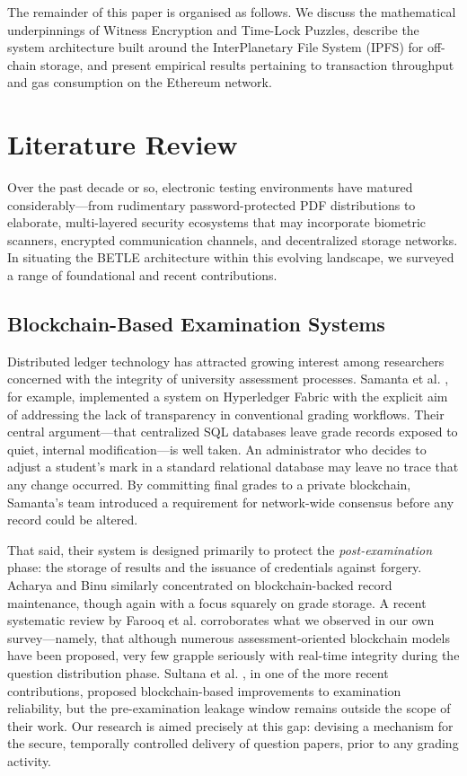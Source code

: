 \documentclass[final,5p,times]{elsarticle}
\begin{document}
The remainder of this paper is organised as follows. We discuss the mathematical underpinnings of Witness Encryption and Time-Lock Puzzles, describe the system architecture built around the InterPlanetary File System (IPFS) for off-chain storage, and present empirical results pertaining to transaction throughput and gas consumption on the Ethereum network.

\section{Literature Review}

Over the past decade or so, electronic testing environments have matured considerably—from rudimentary password-protected PDF distributions to elaborate, multi-layered security ecosystems that may incorporate biometric scanners, encrypted communication channels, and decentralized storage networks. In situating the BETLE architecture within this evolving landscape, we surveyed a range of foundational and recent contributions.

\subsection{Blockchain-Based Examination Systems}
Distributed ledger technology has attracted growing interest among researchers concerned with the integrity of university assessment processes. Samanta et al. \cite{samanta2021blockchain}, for example, implemented a system on Hyperledger Fabric with the explicit aim of addressing the lack of transparency in conventional grading workflows. Their central argument—that centralized SQL databases leave grade records exposed to quiet, internal modification—is well taken. An administrator who decides to adjust a student's mark in a standard relational database may leave no trace that any change occurred. By committing final grades to a private blockchain, Samanta's team introduced a requirement for network-wide consensus before any record could be altered.

That said, their system is designed primarily to protect the \textit{post-examination} phase: the storage of results and the issuance of credentials against forgery. Acharya and Binu \cite{acharya2018blockchain} similarly concentrated on blockchain-backed record maintenance, though again with a focus squarely on grade storage. A recent systematic review by Farooq et al. \cite{farooq2021blockchain} corroborates what we observed in our own survey—namely, that although numerous assessment-oriented blockchain models have been proposed, very few grapple seriously with real-time integrity during the question distribution phase. Sultana et al. \cite{sultana2024proposed}, in one of the more recent contributions, proposed blockchain-based improvements to examination reliability, but the pre-examination leakage window remains outside the scope of their work. Our research is aimed precisely at this gap: devising a mechanism for the secure, temporally controlled delivery of question papers, prior to any grading activity.
\end{document}
